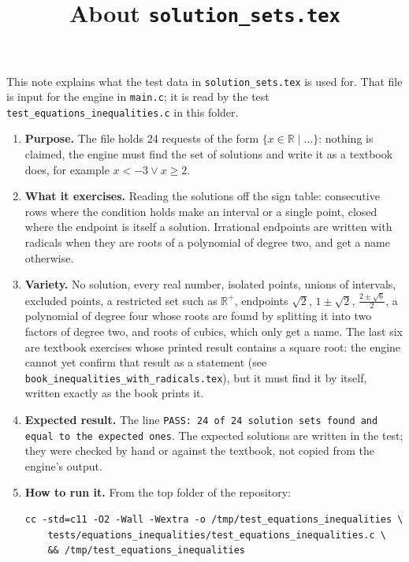 \documentclass[11pt,a4paper]{article}
\title{About \texttt{solution\_sets.tex}}
\author{}
\date{}
\begin{document}
\maketitle
This note explains what the test data in \texttt{solution\_sets.tex} is used for. That file is input for the engine in \texttt{main.c}; it is read by the test \texttt{test\_equations\_inequalities.c} in this folder.

\begin{enumerate}
\item \textbf{Purpose.} The file holds 24 requests of the form $\{x \in \mathbb{R} \mid \ldots\}$: nothing is claimed, the engine must find the set of solutions and write it as a textbook does, for example $x < -3 \lor x \ge 2$.

\item \textbf{What it exercises.} Reading the solutions off the sign table: consecutive rows where the condition holds make an interval or a single point, closed where the endpoint is itself a solution. Irrational endpoints are written with radicals when they are roots of a polynomial of degree two, and get a name otherwise.

\item \textbf{Variety.} No solution, every real number, isolated points, unions of intervals, excluded points, a restricted set such as $\mathbb{R}^{+}$, endpoints $\sqrt{2}$, $1 \pm \sqrt{2}$, $\frac{2 \pm \sqrt{6}}{2}$, a polynomial of degree four whose roots are found by splitting it into two factors of degree two, and roots of cubics, which only get a name. The last six are textbook exercises whose printed result contains a square root: the engine cannot yet confirm that result as a statement (see \texttt{book\_inequalities\_with\_radicals.tex}), but it must find it by itself, written exactly as the book prints it.

\item \textbf{Expected result.} The line \texttt{PASS: 24 of 24 solution sets found and equal to the expected ones}. The expected solutions are written in the test; they were checked by hand or against the textbook, not copied from the engine's output.

\item \textbf{How to run it.} From the top folder of the repository:
\begin{verbatim}
cc -std=c11 -O2 -Wall -Wextra -o /tmp/test_equations_inequalities \
    tests/equations_inequalities/test_equations_inequalities.c \
    && /tmp/test_equations_inequalities
\end{verbatim}
\end{enumerate}
\end{document}
